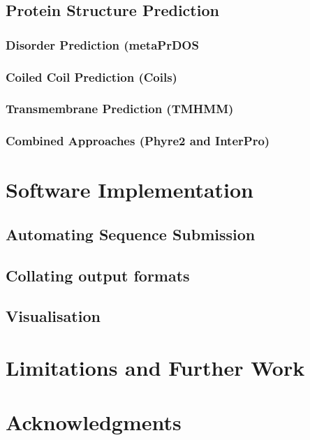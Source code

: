 \documentclass[fleqn,10pt]{SelfArx} %
\begin{document}
\subsection{Protein Structure Prediction}

\subsubsection*{Disorder Prediction (metaPrDOS}

\subsubsection*{Coiled Coil Prediction (Coils)}

\subsubsection*{Transmembrane Prediction (TMHMM)}

\subsubsection*{Combined Approaches (Phyre2 and InterPro)}


\section{Software Implementation}
\subsection{Automating Sequence Submission}
\subsection{Collating output formats}
\subsection{Visualisation}
\section{Limitations and Further Work}
\section*{Acknowledgments}





\end{document}

